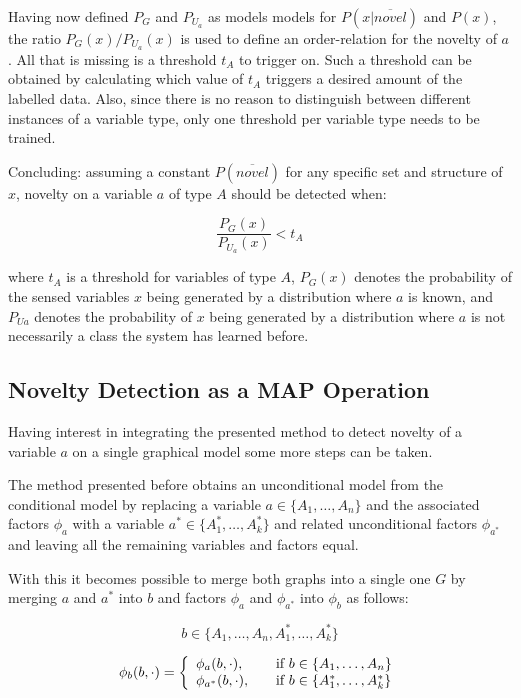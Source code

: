 Having now defined $P_G$ and $P_{U_a}$ as models models for
$P(x|\overline{novel})$ and $P(x)$, the ratio $P_G(x)/P_{U_a}(x)$ is used to
define an order-relation for the novelty of $a$.
All that is missing is a threshold $t_A$ to trigger on.
Such a threshold can be obtained by calculating which value of $t_A$
triggers a desired amount of the labelled data.
Also, since there is no reason to distinguish between different instances of
a variable type, only one threshold per variable type needs to be trained.

Concluding: assuming a constant $P(\overline{novel})$ for any specific set and
structure of $x$, novelty on a variable $a$ of type $A$ should be detected when:

\begin{equation}
\label{eq:threshold-with-ta}
\frac{P_G(x)}{P_{U_a}(x)} < t_A
\end{equation}

where $t_A$ is a threshold for variables of type $A$, $P_G(x)$ denotes the
probability of the sensed variables $x$ being generated by a distribution
where $a$ is known, and $P_{Ua}$ denotes the probability of $x$ being generated
by a distribution where $a$ is not necessarily a class the system has
learned before.


\subsection{Novelty Detection as a MAP Operation}
Having interest in integrating the presented method to detect novelty of a
variable $a$ on a single graphical model some more steps can be taken.

The method presented before obtains an unconditional model
from the conditional model by replacing a variable $a \in \{A_1,\dotsc, A_n\}$
and the associated factors $\phi_a$ with a variable
$a^* \in \{A^*_1,\dots,A^*_k\}$ and related unconditional factors $\phi_{a^*}$
and leaving all the remaining variables and factors equal.

With this it becomes possible to merge both graphs into a single one $G$ by
merging $a$ and $a^*$ into $b$ and factors $\phi_a$ and $\phi_{a^*}$ into
$\phi_b$ as follows:

\[
b \in \{A_1,\dotsc,A_n,A^*_1,\dotsc,A^*_k\}
\]

\[
\phi_b(b, \cdot) = \left\{
  \begin{array}{l l}
    \phi_a(b, \cdot), & \quad \text{if } b \in \{A_1,\dotsc,A_n\} \\
    \phi_{a^*}(b, \cdot), & \quad \text{if } b \in \{A^*_1,\dotsc,A^*_k\}
  \end{array} \right.
\]

